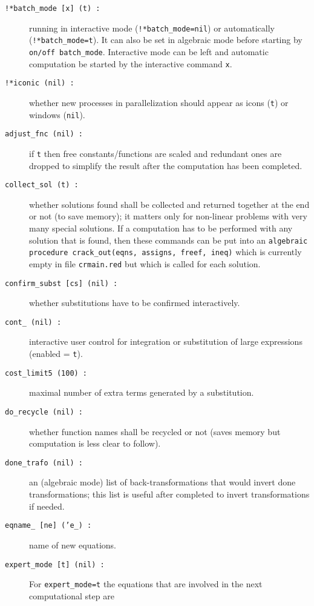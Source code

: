 \begin{description}\sloppy
\item[\texttt{!*batch\_mode [x] (t) :}] running  in
  interactive mode (\texttt{!*batch\_mode=nil}) or automatically
  (\texttt{!*batch\_mode=t}).  It can also be set in algebraic mode
  before starting  by \texttt{on/off batch\_mode}.
  Interactive mode can be left and automatic computation be started by
  the interactive command \texttt{x}.
\item[\texttt{!*iconic (nil) :}] whether new processes in
  parallelization should appear as icons (\texttt{t}) or windows
  (\texttt{nil}).
\item[\texttt{adjust\_fnc (nil) :}] if \texttt{t} then free
  constants/functions are scaled and redundant ones are dropped to
  simplify the result after the computation has been completed.
\item[\texttt{collect\_sol (t) :}] whether solutions found shall be
  collected and returned together at the end or not (to save memory);
  it matters only for non-linear problems with very many special
  solutions.  If a computation has to be performed with any solution
  that is found, then these commands can be put into an
  \texttt{algebraic procedure crack\_out(eqns, assigns, freef, ineq)}
  which is currently empty in file \texttt{crmain.red} but which is
  called for each solution.
\item[\texttt{confirm\_subst [cs] (nil) :}] whether substitutions have
  to be confirmed interactively.
\item[\texttt{cont\_ (nil) :}] interactive user control for
  integration or substitution of large expressions (enabled =
  \texttt{t}).
\item[\texttt{cost\_limit5 (100) :}] maximal number of extra terms
  generated by a substitution.
\item[\texttt{do\_recycle (nil) :}] whether function names shall be
  recycled or not (saves memory but computation is less clear to
  follow).
\item[\texttt{done\_trafo (nil) :}] an (algebraic mode) list of
  back-transformations that would invert done transformations; this
  list is useful after  completed to invert
  transformations if needed.
\item[\texttt{eqname\_ [ne] ('e\_) :}] name of new equations.
\item[\texttt{expert\_mode [t] (nil) :}] For \texttt{expert\_mode=t}
  the equations that are involved in the next computational step are

\end{description}
